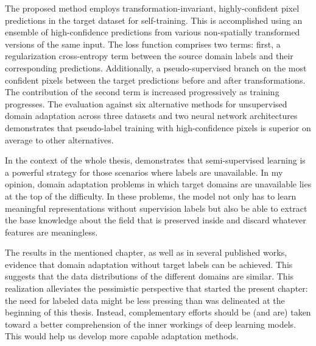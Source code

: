 The proposed method employs transformation-invariant, highly-confident pixel predictions in the target dataset for self-training. This is accomplished using an ensemble of high-confidence predictions from various non-spatially transformed versions of the same input. The loss function comprises two terms: first, a regularization cross-entropy term between the source domain labels and their corresponding predictions. Additionally, a pseudo-supervised branch on the most confident pixels between the target predictions before and after transformations. The contribution of the second term is increased progressively as training progresses. The evaluation against six alternative methods for unsupervised domain adaptation across three datasets and two neural network architectures demonstrates that pseudo-label training with high-confidence pixels is superior on average to other alternatives.  

In the context of the whole thesis,  demonstrates that semi-supervised learning is a powerful strategy for those scenarios where labels are unavailable. In my opinion, domain adaptation problems in which target domains are unavailable lies at the top of the difficulty. In these problems, the model not only has to learn meaningful representations without supervision labels but also be able to extract the base knowledge about the field that is preserved inside and discard whatever features are meaningless. 

The results in the mentioned chapter, as well as in several published works, evidence that domain adaptation without target labels can be achieved. This suggests that the data distributions of the different domains are similar. This realization alleviates the pessimistic perspective that started the present chapter: the need for labeled data might be less pressing than was delineated at the beginning of this thesis. Instead, complementary efforts should be (and are) taken toward a better comprehension of the inner workings of deep learning models. This would help us develop more capable adaptation methods.